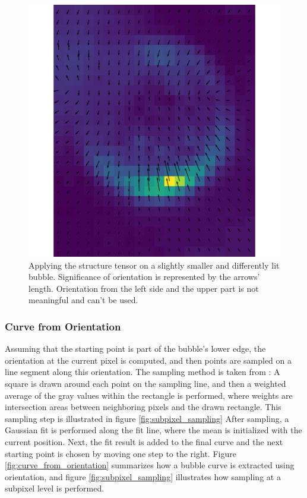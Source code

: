 					
			\begin{figure}
				\includegraphics[scale=0.5]{images/struct_tensor_result_2.png}
				\caption{Applying the structure tensor on a slightly smaller and differently lit bubble. Significance of orientation is represented by the arrows' length. Orientation from the left side and the upper part is not meaningful and can't be used.}
				\label{fig:struct_tensor_result_2}
			\end{figure}
	
	
	
	
	
	
	
			\subsubsection{Curve from Orientation}
				Assuming that the starting point is part of the bubble's lower edge, the orientation at the current pixel is computed, and then points are sampled on a line segment along this orientation. The sampling method is taken from \citet{Bopp2018}: A square is drawn around each point on the sampling line, and then a weighted average of the gray values within the rectangle is performed, where weights are intersection areas between neighboring pixels and the drawn rectangle. This sampling step is illustrated in figure \ref{fig:subpixel_sampling}
				 After sampling, a Gaussian fit is performed along the fit line, where the mean is initialized with the current position. Next, the fit result is added to the final curve and the next starting point is chosen by moving one step to the right. 
				 Figure \ref{fig:curve_from_orientation} summarizes how a bubble curve is extracted using orientation, and figure \ref{fig:subpixel_sampling} illustrates how sampling at a subpixel level is performed.
				 
